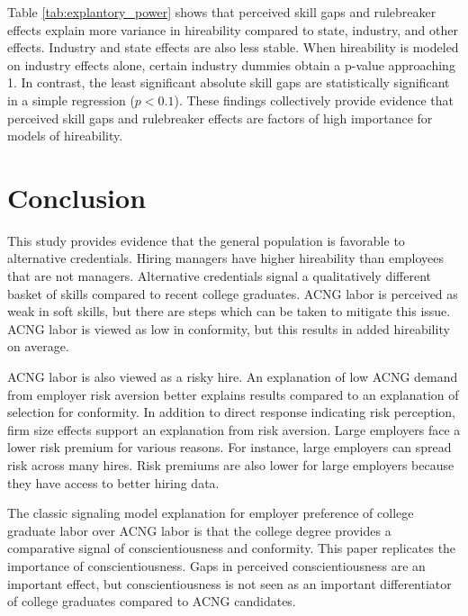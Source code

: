 \documentclass[review]{elsarticle}
\begin{document}
Table \ref{tab:explantory_power} shows that perceived skill gaps and rulebreaker effects explain more
variance in hireability compared to state, industry, and other effects.
Industry and state effects are also less stable.
When hireability is modeled on industry effects alone,
certain industry dummies obtain a p-value approaching 1.
In contrast, the least significant absolute skill gaps are statistically significant in a simple regression ($p < 0.1$).
These findings collectively provide evidence that perceived skill gaps and rulebreaker
effects are factors of high importance for models of hireability.

\section{Conclusion}

This study provides evidence that the general population is favorable to alternative credentials.
Hiring managers have higher hireability than employees that are not managers.
Alternative credentials signal a qualitatively different basket of skills compared to recent college graduates.
ACNG labor is perceived as weak in soft skills, but there are steps which can be taken to mitigate this issue.
ACNG labor is viewed as low in conformity, but this results in added hireability on average.

ACNG labor is also viewed as a risky hire.
An explanation of low ACNG demand from employer risk aversion better explains results
compared to an explanation of selection for conformity.
In addition to direct response indicating risk perception, firm size effects support an explanation from risk aversion.
Large employers face a lower risk premium for various reasons.
For instance, large employers can spread risk across many hires.
Risk premiums are also lower for large employers because they have access to better hiring data.

The classic signaling model explanation for employer preference of college graduate labor over ACNG labor is that
the college degree provides a comparative signal of conscientiousness and conformity.
This paper replicates the importance of conscientiousness.
Gaps in perceived conscientiousness are an important effect,
but conscientiousness is not seen as an important differentiator of college graduates compared to ACNG candidates.
\end{document}
